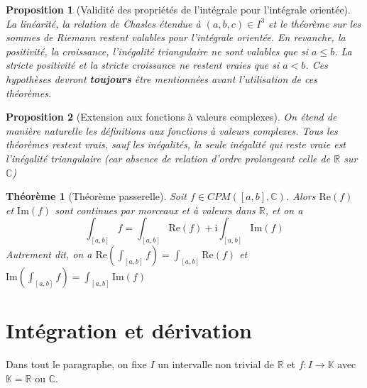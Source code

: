 \documentclass[french]{book}
\newcommand{\R}{\mathbb{R}}
\newcommand{\C}{\mathbb{C}}
\newcommand{\K}{\mathbb{K}}
\theoremstyle{plain}
\newtheorem{thm}{Théorème}[chapter]
\newtheorem{prop}{Proposition}[chapter]
\theoremstyle{definition}
\theoremstyle{remark}
\begin{document}
\begin{prop}[Validité des propriétés de l'intégrale pour l'intégrale orientée]
	La linéarité, la relation de Chasles étendue à $(a,b,c)\in I^3$ et le théorème sur les sommes de Riemann restent valables pour l'intégrale orientée. En revanche, la positivité, la croissance, l'inégalité triangulaire ne sont valables que si $a\leqslant b$. La stricte positivité et la stricte croissance ne restent vraies que si $a<b$. Ces hypothèses devront \textbf{toujours} être mentionnées avant l'utilisation de ces théorèmes.
\end{prop}
\begin{prop}[Extension aux fonctions à valeurs complexes]
	On étend de manière naturelle les définitions aux fonctions à valeurs complexes. Tous les théorèmes restent vrais, sauf les inégalités, la seule inégalité qui reste vraie est l'inégalité triangulaire (car absence de relation d'ordre prolongeant celle de $\R$ sur $\C$)
\end{prop}
\begin{thm}[Théorème passerelle]
	Soit $f\in CPM([a,b],\C)$. Alors $\text{Re}(f)$ et $\text{Im}(f)$ sont continues par morceaux et à valeurs dans $\R$, et on a $$\int_{[a,b]}f=\int_{[a,b]}\text{Re}(f)+\text{i}\int_{[a,b]}\text{Im}(f)$$ Autrement dit, on a $\displaystyle \text{Re}\left(\int_{[a,b]}f\right)=\int_{[a,b]}\text{Re}(f)$ et $\displaystyle \text{Im}\left(\int_{[a,b]}f\right)=\int_{[a,b]}\text{Im}(f)$
\end{thm}

\section{Intégration et dérivation}
Dans tout le paragraphe, on fixe $I$ un intervalle non trivial de $\R$ et $f:I\rightarrow\K$ avec $\K=\R$ ou $\C$.
\end{document}
